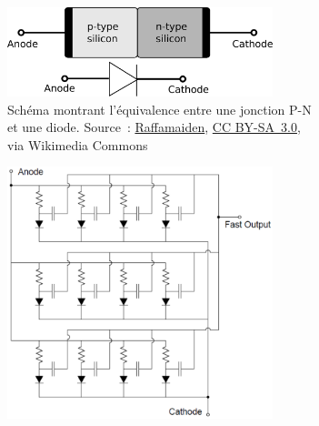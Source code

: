 \begin{figure}
    \centering
    \begin{subfigure}[c]{0.45\textwidth}
        \centering
        \includegraphics[trim= 0 -585 0 -585, width=0.85\textwidth]{img/she/1920px-PN_diode_with_electrical_symbol.svg.png}
        
        \caption{Schéma montrant l'équivalence entre une jonction P-N et une diode. Source~: \href{https://commons.wikimedia.org/wiki/File:PN_diode_with_electrical_symbol.svg}{Raffamaiden}, \href{https://creativecommons.org/licenses/by-sa/3.0}{CC BY-SA~3.0}, via Wikimedia Commons}
        \label{fig_pn_diode}
    \end{subfigure}
    \begin{subfigure}[c]{0.45\textwidth}
        \centering
        \includegraphics[width=0.85\textwidth]{img/she/SiPM_arithecture.png}
        

\end{subfigure}
\end{figure}
